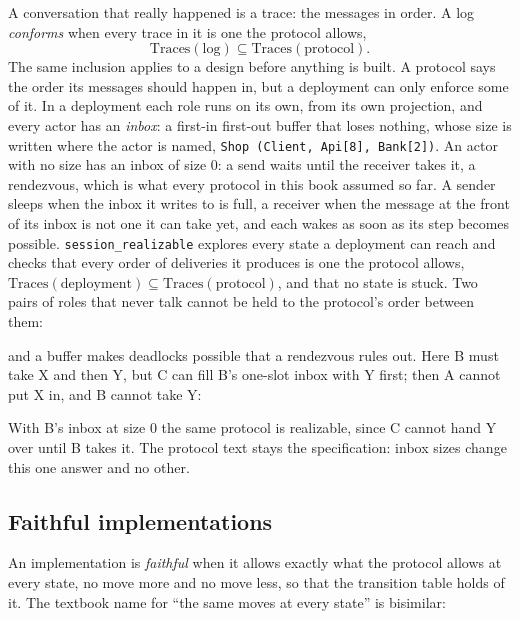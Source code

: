 A conversation that really happened is a trace: the messages in order. A log
\emph{conforms} when every trace in it is one the protocol allows,
\[
\mathrm{Traces}(\text{log}) \subseteq \mathrm{Traces}(\text{protocol}).
\]
The same inclusion applies to a design before anything is built. A protocol says the order
its messages should happen in, but a deployment can only enforce some of it. In a deployment
each role runs on its own, from its own projection, and every actor has an \emph{inbox}: a
first-in first-out buffer that loses nothing, whose size is written where the actor is named,
\texttt{Shop (Client, Api[8], Bank[2])}. An actor with no size has an inbox of size 0: a send
waits until the receiver takes it, a rendezvous, which is what every protocol in this book
assumed so far. A sender sleeps when the inbox it writes to is full, a receiver when the
message at the front of its inbox is not one it can take yet, and each wakes as soon as its
step becomes possible. \texttt{session\_realizable} explores every state a deployment can
reach and checks that every order of deliveries it produces is one the protocol allows,
$\mathrm{Traces}(\text{deployment}) \subseteq \mathrm{Traces}(\text{protocol})$, and that no
state is stuck. Two pairs of roles that never talk cannot be held to the protocol's order
between them:



and a buffer makes deadlocks possible that a rendezvous rules out. Here B must take X and then
Y, but C can fill B's one-slot inbox with Y first; then A cannot put X in, and B cannot take Y:



With B's inbox at size 0 the same protocol is realizable, since C cannot hand Y over until B
takes it. The protocol text stays the specification: inbox sizes change this one answer and
no other.

\subsection{Faithful implementations}

An implementation is \emph{faithful} when it allows exactly what the protocol allows at
every state, no move more and no move less, so that the transition table holds of it.
The textbook name for ``the same moves at every state'' is bisimilar:

